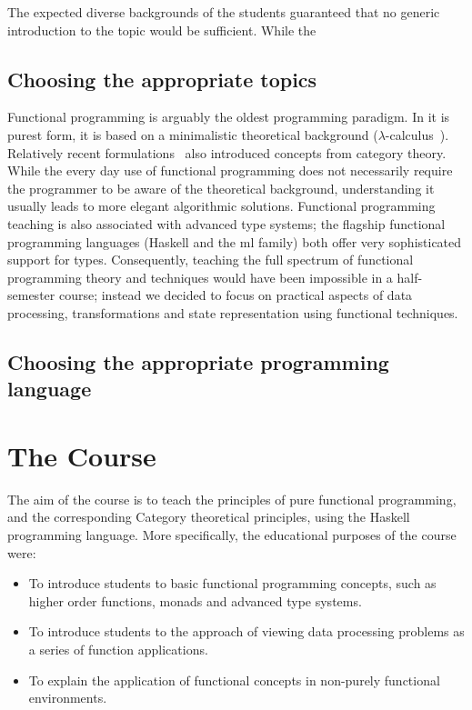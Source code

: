 \documentclass[conference]{IEEEtran}
\begin{document}
The expected diverse backgrounds of the students guaranteed that no generic
introduction to the topic would be sufficient. While the  

\subsection{Choosing the appropriate topics}

Functional programming is arguably the oldest programming paradigm. In it is
purest form, it is based on a minimalistic theoretical background
($\lambda$-calculus~\cite{Baren84}). Relatively recent
formulations~\cite{Meije91, Wadle93} also introduced concepts from category
theory. While the every day use of functional programming does not necessarily
require the programmer to be aware of the theoretical background, understanding
it usually leads to more elegant algorithmic solutions. Functional
programming teaching is also associated with advanced type systems; the flagship
functional programming languages (Haskell and the {\sc ml} family) both offer
very sophisticated support for types. Consequently, teaching the full spectrum
of functional programming theory and techniques would have been impossible in a
half-semester course; instead we decided to focus on practical aspects of data
processing, transformations and state representation using functional techniques.

\subsection{Choosing the appropriate programming language}


\section{The Course}

The aim of the course is to teach the principles of pure functional
programming, and the corresponding Category theoretical principles, using the
Haskell programming language. More specifically, the educational purposes
of the course were:

\begin{itemize}

  \item To introduce students to basic functional programming concepts, such
    as higher order functions, monads and advanced type systems.

  \item To introduce students to the approach of viewing data processing
    problems as a series of function applications.

  \item To explain the application of functional concepts in non-purely
    functional environments.

\end{itemize}
\end{document}
